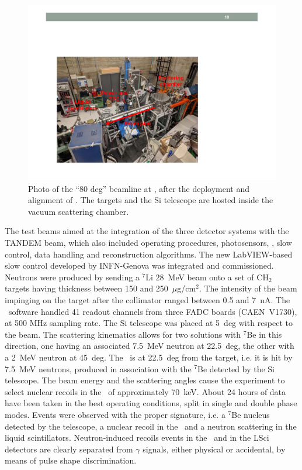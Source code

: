 \begin{figure}[t!]
\centering
\includegraphics[width=0.7\columnwidth]{./Figures/BeamLineDisplay.pdf}
\caption[Picture of the \LNS\ beamline in use for \ReD]{Photo of the ``80 deg'' 
beamline at \LNS, after the deployment and alignment of \ReD.  The targets and the Si 
telescope are hosted inside the vacuum scattering chamber.}
\label{fig:BeamlinePhoto}
\end{figure}

The test beams aimed at the integration of the three detector systems with the TANDEM beam, which 
also included operating procedures, photosensors, \DAQ, slow control, data handling and 
reconstruction algorithms. The new LabVIEW-based slow control developed by INFN-Genova was 
integrated and commissioned. Neutrons were produced by sending a $^{7}$Li 28~MeV beam 
onto a set of CH$_2$ targets having thickness between 150 and 250~$\mu$g/cm$^2$. 
The intensity of the beam impinging on the target after the collimator ranged between 0.5 
and 7~nA. The \DAQ\ software handled 41 readout channels from three FADC boards (CAEN~V1730), 
at 500 MHz sampling rate. The Si telescope was placed at 5~deg with respect to the beam. 
The scattering kinematics allows for two solutions 
with $^{7}$Be in this direction, one having an associated 7.5~MeV neutron at 22.5~deg, 
the other with a 2~MeV neutron at 45~deg. The \LArTPC\ is at 22.5~deg from the target, 
i.e. it is hit by 7.5~MeV neutrons, produced in association with the $^{7}$Be detected by the 
Si telescope. The beam energy and the scattering angles cause the experiment to select 
nuclear recoils in the \TPC\ of approximately 70~keV.
About 24 hours of data have been taken in the best operating conditions, split in single and 
double phase modes. Events were observed with the proper signature, i.e. a $^{7}$Be nucleus 
detected by the telescope, a nuclear recoil in the \LArTPC\ and a neutron scattering in the 
liquid scintillators. Neutron-induced recoils events in the \TPC\ and in the LSci 
detectors are clearly separated from $\gamma$ signals, either physical or accidental,
by means of pulse shape discrimination.\\ 

